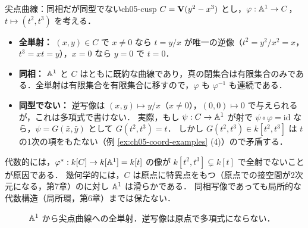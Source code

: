 \begin{myex}{尖点曲線：同相だが同型でない}{ch05-cusp}
$C=\mathbf{V}(y^2-x^3)$ とし，$\varphi:\mathbb{A}^1\to C$，$t\mapsto(t^2,t^3)$ を考える．
\begin{itemize}
  \item \textbf{全単射：} $(x,y)\in C$ で $x\neq0$ なら $t=y/x$ が唯一の逆像（$t^2=y^2/x^2=x$，$t^3=x t=y$），$x=0$ なら $y=0$ で $t=0$．
  \item \textbf{同相：} $\mathbb{A}^1$ と $C$ はともに既約な曲線であり，真の閉集合は有限集合のみである．全単射は有限集合を有限集合に移すので，$\varphi$ も $\varphi^{-1}$ も連続である．
  \item \textbf{同型でない：} 逆写像は $(x,y)\mapsto y/x$（$x\ne 0$），$(0,0)\mapsto0$ で与えられるが，これは多項式で書けない．
        実際，もし $\psi:C\to\mathbb{A}^1$ が射で $\psi\circ\varphi=\mathrm{id}$ なら，$\psi=G(\bar x,\bar y)$ として $G(t^2,t^3)=t$．
        しかし $G(t^2,t^3)\in k[t^2,t^3]$ は $t$ の1次の項をもたない（例 \ref{ex:ch05-coord-examples} (4)）ので矛盾する．
\end{itemize}
代数的には，$\varphi^*:k[C]\to k[\mathbb{A}^1]=k[t]$ の像が $k[t^2,t^3]\subsetneq k[t]$ で全射でないことが原因である．
幾何学的には，$C$ は原点に特異点をもつ（原点での接空間が2次元になる，第7章）のに対し $\mathbb{A}^1$ は滑らかである．
同相写像であっても局所的な代数構造（局所環，第6章）までは保たない．
\end{myex}

\begin{figure}[H]
\centering
{}
\caption{$\mathbb{A}^1$ から尖点曲線への全単射．逆写像は原点で多項式にならない．}
\label{fig:ch05-cusp}
\end{figure}

